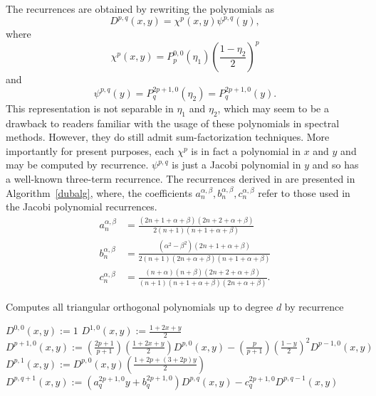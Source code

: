 The recurrences are obtained by rewriting the polynomials as
\[
D^{p,q}(x,y) = \chi^{p}(x,y) \psi^{p,q}(y),
\]
where \[
 \chi^{p}(x,y) = P^{0,0}_p(\eta_1) \left( \frac{1-\eta_2}{2}
\right)^p
\]
and
\[
\psi^{p,q}(y) = P^{2p+1,0}_q(\eta_2) = P^{2p+1,0}_q(y).
\]
This representation is not separable in \( \eta_1 \) and \( \eta_2
\), which may seem to be a drawback to readers familiar with the
usage of these polynomials in spectral methods.  However, they do
still admit sum-factorization techniques.  More importantly for
present purposes, each \( \chi^p \) is in fact a polynomial in \(
x \) and \( y \) and may be computed by recurrence.  \( \psi^{p,q}
\) is just a Jacobi polynomial in \( y \) and so has a well-known
three-term recurrence.  The recurrences derived in \citet{Kirby2009}
are presented in Algorithm~\ref{dubalg}, where, the coefficients \(
a_n^{\alpha,\beta},b_n^{\alpha,\beta},c_n^{\alpha,\beta} \) refer to
those used in the Jacobi polynomial recurrences.
\begin{equation}
\label{eq:recurcoeff}
\begin{split}
a^{\alpha,\beta}_n
  & = \frac{(2n + 1 + \alpha + \beta)(2n + 2 + \alpha + \beta)}
             {2(n+1)(n+1+\alpha+\beta)}
\\
b^{\alpha,\beta}_n
  & = \frac{(\alpha^2 -\beta^2)(2n+1+\alpha+\beta)}
             {2(n+1)(2n+\alpha+\beta)(n+1+\alpha+\beta)}\\
c^{\alpha,\beta}_n & = \frac{(n+\alpha)(n+\beta)(2n+2+\alpha+\beta)}
             {(n+1)(n+1+\alpha+\beta)(2n+\alpha+\beta)}.
\end{split}
\end{equation}
\begin{algorithm}
\caption{Computes all triangular orthogonal polynomials up to degree
  \( d \) by recurrence}
\label{dubalg}
\begin{algorithmic}[1]
\State $D^{0,0}(x,y) := 1$
\State $D^{1,0}(x,y) := \frac{1+2x+y}{2}$
\State $D^{p+1,0}(x,y) := \left( \frac{2p+1}{p+1} \right)
\left( \frac{1 + 2x + y}{2} \right) D^{p,0}(x,y)
- \left( \frac{p}{p+1} \right) \left( \frac{1-y}{2} \right)^2
D^{p-1,0}(x,y)$
\EndFor
{}
\State $D^{p,1}(x,y) := D^{p,0}(x,y) \left( \frac{1+2p+(3+2p) y}{2} \right)$
\EndFor
{}
\State $D^{p,q+1}(x,y) :=
\left( a_{q}^{2p+1,0} y + b_q^{2p+1,0} \right) D^{p,q}(x,y)
- c_q^{2p+1,0} D^{p,q-1}(x,y)$
\EndFor
\EndFor
\end{algorithmic}
\end{algorithm}


